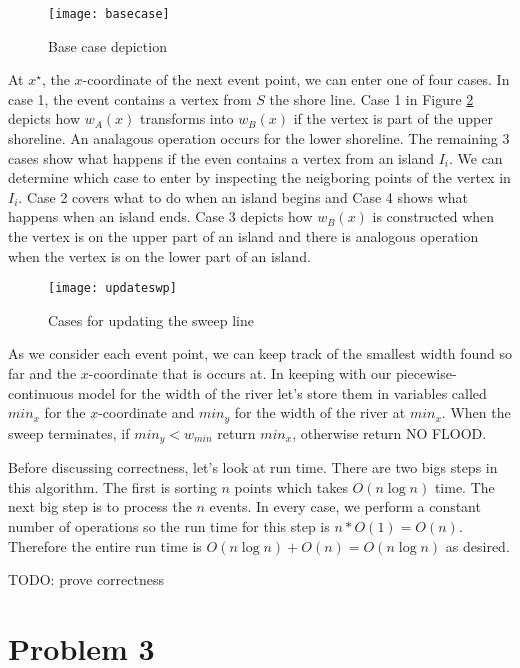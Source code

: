 \documentclass[11pt]{article}
\begin{document}
\begin{figure}[h]
    \centering
    \texttt{[image: basecase]}
    \caption{Base case depiction}
    \label{fig:basecase}
\end{figure}

At $x^\star$, the $x$-coordinate of the next event point, we can enter one of four cases.
In case 1, the event contains a vertex from $S$ the shore line.
Case 1 in Figure \ref{fig:updateswp} depicts how $w_A(x)$ transforms into $w_B(x)$ if the vertex is part of the upper shoreline.
An analagous operation occurs for the lower shoreline.
The remaining 3 cases show what happens if the even contains a vertex from an island $I_i$.
We can determine which case to enter by inspecting the neigboring points of the vertex in $I_i$.
Case 2 covers what to do when an island begins and Case 4 shows what happens when an island ends.
Case 3 depicts how $w_B (x)$ is constructed when the vertex is on the upper part of an island and there is analogous operation when the vertex is on the lower part of an island.

\begin{figure}[h]
    \centering
    \texttt{[image: updateswp]}
    \caption{Cases for updating the sweep line}
    \label{fig:updateswp}
\end{figure}

As we consider each event point, we can keep track of the smallest width found so far and the $x$-coordinate that is occurs at.
In keeping with our piecewise-continuous model for the width of the river let's store them in variables called $min_x$ for the $x$-coordinate and $min_y$ for the width of the river at $min_x$.
When the sweep terminates, if $min_y < w_{min}$ return $min_x$, otherwise return NO FLOOD.

Before discussing correctness, let's look at run time.
There are two bigs steps in this algorithm.
The first is sorting $n$ points which takes $O(n \log n)$ time.
The next big step is to process the $n$ events.
In every case, we perform a constant number of operations so the run time for this step is $n * O(1) = O(n)$.
Therefore the entire run time is $O(n \log n) + O(n) = O(n \log n)$ as desired.

TODO: prove correctness

\newpage
\section*{Problem 3}
\end{document}
